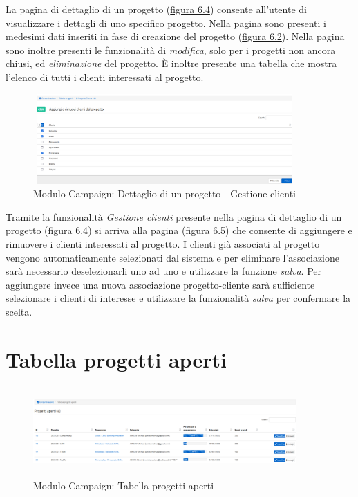 \noindent La pagina di dettaglio di un progetto ({\hyperref[fig:dettaglioProgetto]{figura 6.4}}) consente all'utente di visualizzare i dettagli di uno specifico progetto. Nella pagina sono presenti i medesimi dati inseriti in fase di creazione del progetto ({\hyperref[fig:nuovoProgetto]{figura 6.2}}). Nella pagina sono inoltre presenti le funzionalità di \textit{modifica}, solo per i progetti non ancora chiusi, ed \textit{eliminazione} del progetto. È inoltre presente una tabella che mostra l'elenco di tutti i clienti interessati al progetto. 

\begin{figure}[!h]
\centering
\includegraphics[width=380px, height=130px]{../images/UI/06-aggiungiRimuoviClienti.png}
\caption{Modulo Campaign: Dettaglio di un progetto - Gestione clienti}
\label{fig:gestioneClienti}
\end{figure}

\noindent Tramite la funzionalità \textit{Gestione clienti} presente nella pagina di dettaglio di un progetto ({\hyperref[fig:dettaglioProgetto]{figura 6.4}}) si arriva alla pagina ({\hyperref[fig:gestioneClienti]{figura 6.5}}) che consente di aggiungere e rimuovere i clienti interessati al progetto. I clienti già associati al progetto vengono automaticamente selezionati dal sistema e per eliminare l'associazione sarà necessario deselezionarli uno ad uno e utilizzare la funzione \textit{salva}. Per aggiungere invece una nuova associazione progetto-cliente sarà sufficiente selezionare i clienti di interesse e utilizzare la funzionalità \textit{salva} per confermare la scelta.

\pagebreak

\section{Tabella progetti aperti}
\begin{figure}[!h]
\centering
\includegraphics[width=380px, height=130px]{../images/UI/07-tabellaProgettiAperti.png}
\caption{Modulo Campaign: Tabella progetti aperti}
\label{fig:tabellaProgettiAperti}
\end{figure}

